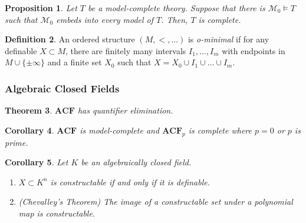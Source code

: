 \documentclass{amsart}
\newtheorem{theorem}{Theorem}[subsection]
\newtheorem{lemma}[theorem]{Lemma}
\newtheorem{proposition}[theorem]{Proposition}
\newtheorem{corollary}[theorem]{Corollary}
\theoremstyle{definition}
\newtheorem{definition}[theorem]{Definition}
\numberwithin{equation}{section}
\begin{document}
\begin{proposition}
  Let $T$ be a model-complete theory.
  Suppose that there is $\mathcal{M}_0 \models T$ such that $\mathcal{M}_0$ embeds into every model of $T$.
  Then, $T$ is complete.
\end{proposition}

\begin{definition}
  An ordered structure $(M,<,\dots)$ is \emph{o-minimal} if
  for any definable $X \subset M$,
  there are finitely many intervals $I_1,\dots,I_m$ with endpoints in $M \cup \{\pm\infty\}$
  and a finite set $X_0$ such that $X = X_0 \cup I_1 \cup \dots \cup I_m$.
\end{definition}

\subsubsection{Algebraic Closed Fields}


\begin{theorem}
  $\mathbf{ACF}$ has quantifier elimination.
\end{theorem}

\begin{corollary}
  $\mathbf{ACF}$ is model-complete and $\mathbf{ACF}_p$ is complete where $p = 0$ or $p$ is prime.
\end{corollary}



\begin{corollary}
  Let $K$ be an algebraically closed field.
  \begin{enumerate}[label = {\roman*)}]
    \item $X \subset K^n$ is constructable if and only if it is definable.
    \item (Chevalley's Theorem) The image of a constructable set under a polynomial map is constructable.
  \end{enumerate}
\end{corollary}
\end{document}
